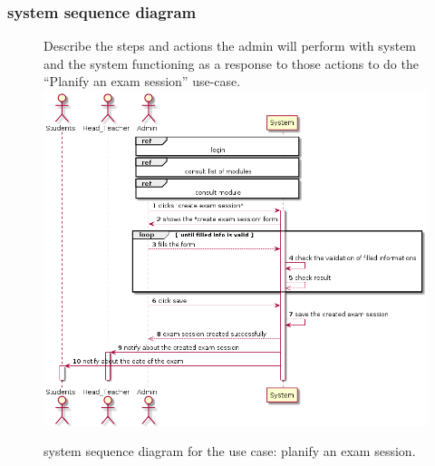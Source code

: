 \documentclass[]{uc2pfecaneva}
\begin{document}
    \subsubsection{system sequence diagram}
    \begin{figure}[h]
        Describe the steps and actions the admin will perform with system and the system functioning
        as a response to those actions to do the “Planify an exam session” use-case.
        \centering
        \includegraphics[width=\textwidth]{images/create_exam_session}

        \caption{system sequence diagram for the use case: planify an exam session.}
    \end{figure}
    \clearpage
\end{document}
